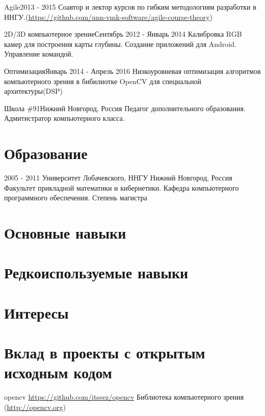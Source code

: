 \documentclass[12pt,a4paper]{moderncv}
\begin{document}
\cventry{}
	{Agile}{2013 - 2015}{}{}
	{Соавтор и лектор курсов по гибким методологиям разработки в ННГУ.\newline(\url{https://github.com/unn-vmk-software/agile-course-theory})}

\cventry{}
	{2D/3D компьютерное зрение}{Сентябрь 2012 - Январь 2014}{}{}
	{Калибровка RGB камер для построения карты глубины. Создание приложений для Android. Управление командой.}

\cventry{}
	{Оптимизация}{Январь 2014 - Апрель 2016}{}{}
	{Низкоуровневая оптимизация алгоритмов компьютерного зрения в бибилиотке OpenCV для специальной архитектуры(DSP)}

	{Школа \#91}{Нижний Новгород, Россия}{}{}
	{Педагог дополнительного образования. Адмитистратор компьютерного класса.}

\section{Образование}
  \cventry
    {2005 - 2011}
    {Университет Лобачевского, ННГУ}
    {Нижний Новгород, Россия}
    {}{}
    {Факультет прикладной математики и кибернетики. Кафедра компьютерного программного обеспечения.\newline{}
    Степень магистра}


\section{Основные навыки}

\section{Редкоиспользуемые навыки}

\section{Интересы}


\section{Вклад в проекты с открытым исходным кодом}
\cvline
  {opencv}
  {\url{https://github.com/itseez/opencv}\newline{}
  Библиотека компьютерного зрения (\url{http://opencv.org})}
\end{document}
